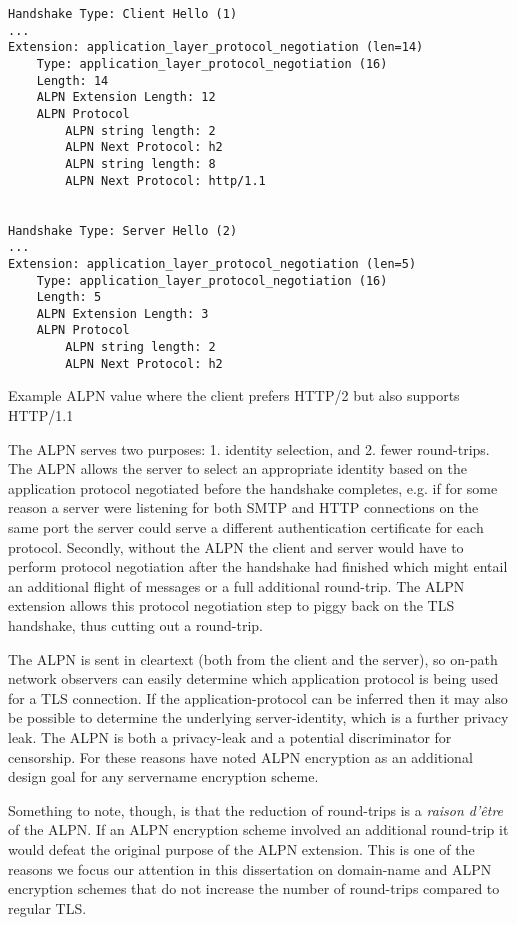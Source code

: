 \begin{listing}
\begin{Verbatim}[frame=single]
Handshake Type: Client Hello (1)
...
Extension: application_layer_protocol_negotiation (len=14)
    Type: application_layer_protocol_negotiation (16)
    Length: 14
    ALPN Extension Length: 12
    ALPN Protocol
        ALPN string length: 2
        ALPN Next Protocol: h2
        ALPN string length: 8
        ALPN Next Protocol: http/1.1


Handshake Type: Server Hello (2)
...
Extension: application_layer_protocol_negotiation (len=5)
    Type: application_layer_protocol_negotiation (16)
    Length: 5
    ALPN Extension Length: 3
    ALPN Protocol
        ALPN string length: 2
        ALPN Next Protocol: h2
\end{Verbatim}
\captionsetup{width=0.8\linewidth}
\caption[Example ALPN Value]{\label{lst:alpn-example-h2}Example \ac{ALPN} value where the client prefers \ac{HTTP}/2 but also supports \ac{HTTP}/1.1}
\end{listing}

The \ac{ALPN} serves two purposes: 1. identity selection, and 2. fewer round-trips.
The \ac{ALPN} allows the server to select an appropriate identity based on the application
protocol negotiated before the handshake completes, e.g. if for some reason a server were listening for both \ac{SMTP} and  \ac{HTTP} connections on the same port
the server could serve a different authentication certificate for each protocol.
Secondly, without the \ac{ALPN} the client and server would have to perform protocol negotiation after the handshake had finished
which might entail an additional flight of messages or a full additional round-trip.
The \ac{ALPN} extension allows
this protocol negotiation step to piggy back on the \ac{TLS} handshake, thus cutting out a round-trip.

The \ac{ALPN} is sent in cleartext (both from the client and the server), so on-path network observers
can easily determine which application protocol is being used for a \ac{TLS} connection.
If the application-protocol can be inferred then it may also be possible to determine the underlying server-identity,
which is a further privacy leak.
The \ac{ALPN} is both a privacy-leak and a potential discriminator for censorship.
For these reasons \cite{rfc8744-issues} have noted \ac{ALPN} encryption as an additional design goal
for any servername encryption scheme.

Something to note, though, is that the reduction of round-trips is a {\em raison d'être} of the \ac{ALPN}.
If an \ac{ALPN} encryption scheme involved an additional round-trip it would defeat the original purpose of the \ac{ALPN} extension.
This is one of the reasons we focus our attention in this dissertation on domain-name and \ac{ALPN} encryption schemes that
do not increase the number of round-trips compared to regular \ac{TLS}.

